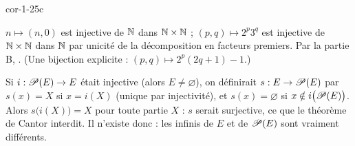 \begin{blocLivre}{cor-1-25c}
\begin{corrigeSuite}
\begin{questions}[start=10]
  \item $n\mapsto(n,0)$ est injective de $\mathbb{N}$ dans $\mathbb{N}\times\mathbb{N}$ ;
    $(p,q)\mapsto2^{p}3^{q}$ est injective de $\mathbb{N}\times\mathbb{N}$ dans $\mathbb{N}$ par
    unicité de la décomposition en facteurs premiers. Par la partie B,
    . (Une bijection
    explicite : $(p,q)\mapsto2^{p}(2q+1)-1$.)
  \item Si $i:\mathscr{P}(E)\to E$ était injective (alors $E\neq\varnothing$),
    on définirait $s:E\to\mathscr{P}(E)$ par $s(x)=X$ si $x=i(X)$ (unique
    par injectivité), et $s(x)=\varnothing$ si $x\notin i\bigl(\mathscr{P}(E)\bigr)$.
    Alors $s\bigl(i(X)\bigr)=X$ pour toute partie $X$ : $s$ serait
    surjective, ce que le théorème de Cantor interdit. Il n'existe donc
     : les
    infinis de $E$ et de $\mathscr{P}(E)$ sont vraiment différents.
\end{questions}
\end{corrigeSuite}
\end{blocLivre}
